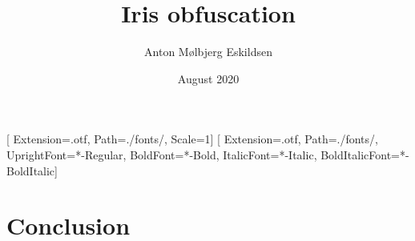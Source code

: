 \documentclass[11pt, a4paper, twoside]{report}
\title{Iris obfuscation}
\author{Anton Mølbjerg Eskildsen}
\date{August 2020}
\begin{document}
[
Extension={.otf},
Path=./fonts/,
Scale=1]
\setmainfont{STIX2Text}[
Extension={.otf},
Path=./fonts/,
UprightFont={*-Regular},
BoldFont={*-Bold},
ItalicFont={*-Italic},
BoldItalicFont={*-BoldItalic}]

\maketitle

\tableofcontents

\printnoidxglossaries
\printnomenclature[1in]















\chapter{Conclusion}

\printbibliography
\end{document}
